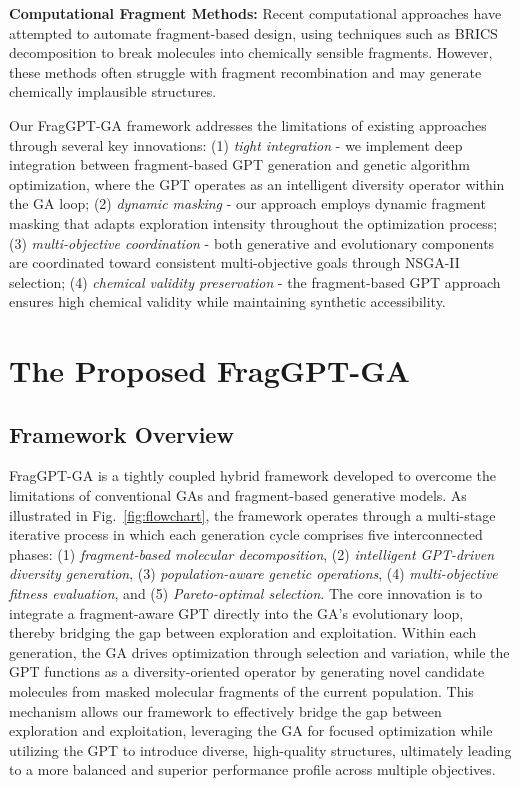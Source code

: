 \documentclass[lettersize,journal]{IEEEtran}
\begin{document}
\noindent \textbf{Computational Fragment Methods:} Recent computational approaches have attempted to automate fragment-based design, using techniques such as BRICS decomposition to break molecules into chemically sensible fragments. However, these methods often struggle with fragment recombination and may generate chemically implausible structures.

Our FragGPT-GA framework addresses the limitations of existing approaches through several key innovations: (1) \textit{tight integration} - we implement deep integration between fragment-based GPT generation and genetic algorithm optimization, where the GPT operates as an intelligent diversity operator within the GA loop; (2) \textit{dynamic masking} - our approach employs dynamic fragment masking that adapts exploration intensity throughout the optimization process; (3) \textit{multi-objective coordination} - both generative and evolutionary components are coordinated toward consistent multi-objective goals through NSGA-II selection; (4) \textit{chemical validity preservation} - the fragment-based GPT approach ensures high chemical validity while maintaining synthetic accessibility.



\section{The Proposed FragGPT-GA}

\subsection{Framework Overview}

FragGPT-GA is a tightly coupled hybrid framework developed to overcome the limitations of conventional GAs and fragment-based generative models. As illustrated in Fig.~\ref{fig:flowchart}, the framework operates through a multi-stage iterative process in which each generation cycle comprises five interconnected phases: (1) \textit{fragment-based molecular decomposition}, (2) \textit{intelligent GPT-driven diversity generation}, (3) \textit{population-aware genetic operations}, (4) \textit{multi-objective fitness evaluation}, and (5) \textit{Pareto-optimal selection}. The core innovation is to integrate a fragment-aware GPT directly into the GA’s evolutionary loop, thereby bridging the gap between exploration and exploitation. Within each generation, the GA drives optimization through selection and variation, while the GPT functions as a diversity-oriented operator by generating novel candidate molecules from masked molecular fragments of the current population. This mechanism allows our framework to effectively bridge the gap between exploration and exploitation, leveraging the GA for focused optimization while utilizing the GPT to introduce diverse, high-quality structures, ultimately leading to a more balanced and superior performance profile across multiple objectives.
\end{document}
